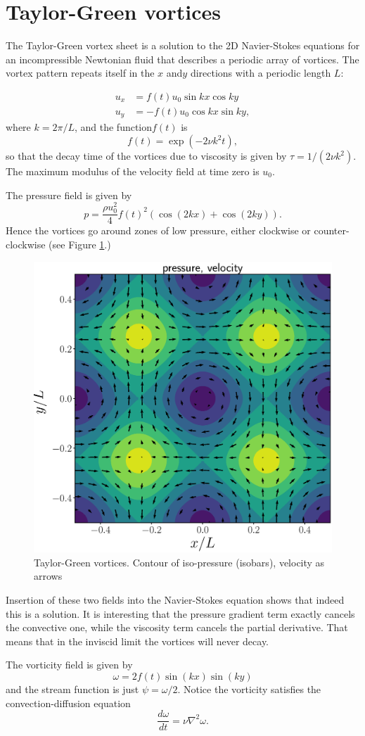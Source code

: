 \section{Taylor-Green vortices}

The Taylor-Green vortex sheet is a solution to the 2D Navier-Stokes
equations for an incompressible Newtonian fluid that describes a
periodic array of vortices. The vortex pattern repeats itself in the
$ x$ and$ y$ directions with a periodic length $ L$:

\begin{align*}
 u_x &= f(t) u_0 \sin k x \cos k y  \\
 u_y &= -f(t) u_0 \cos k x \sin k y ,
\end{align*}
where $ k=2\pi/L$, and the function$ f(t)$ is
\[
  f(t)= \exp(-2\nu k^2 t),
\]
so that the decay time of the vortices due to viscosity is given by
$ \tau=1/(2\nu
k^2)$. The maximum modulus of the velocity field at time zero is
$ u_0$.

The pressure field is given by
\[
  p = \frac{\rho u_0^2 }{4} f(t)^2 \left( \cos (2kx) + \cos (2ky) \right) .
\]
%
Hence the vortices go around zones of low pressure, either
clockwise or counter-clockwise (see Figure
\ref{fig:taylor-green_vortices }.)


\begin{figure}
  \centering
  \includegraphics[width=0.4\linewidth]{figures/taylor-green_vortices}
  \caption{Taylor-Green vortices. Contour of iso-pressure (isobars),
    velocity as arrows \label{fig:taylor-green_vortices }}
\end{figure}

Insertion of these two fields into the Navier-Stokes equation shows
that indeed this is a solution. It is interesting that the pressure
gradient term exactly cancels the convective one, while the viscosity
term cancels the partial derivative. That means that in the inviscid
limit the vortices will never decay.

The vorticity field is given by
\[
  \omega = 2 f(t) \sin (kx) \sin (ky)
\]
and the stream function is just $ \psi=\omega /2$. Notice the
vorticity satisfies the convection-diffusion equation
\[
  \frac{d \omega}{d t}= \nu \nabla^2 \omega.
\]



